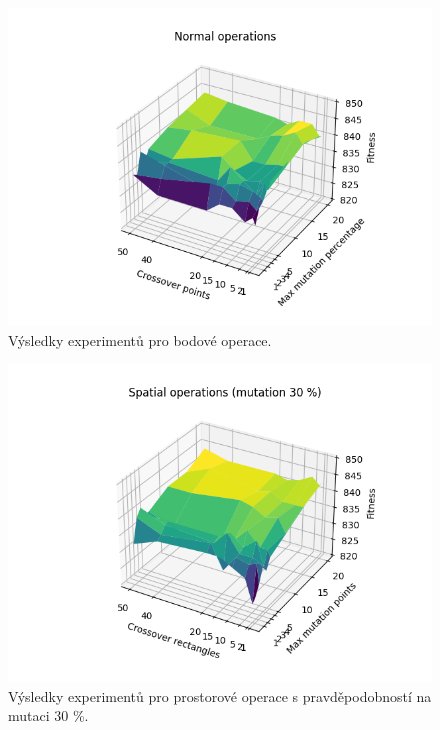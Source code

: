 \documentclass[12pt]{article}
\begin{document}
\newpage
\begin{figure}
    \centering
    \includegraphics[width=0.6\paperwidth,trim={0  0.cm 0 0.8cm},clip]{normal.png}
    \caption{Výsledky experimentů pro bodové operace.}
    \label{normal}
\end{figure}

\begin{figure}
    \centering
    \includegraphics[width=0.6\paperwidth,trim={0  0.2cm 0 0.8cm},clip]{spatial30.png}
    \caption{Výsledky experimentů pro prostorové operace s pravděpodobností na mutaci 30 \%.}
    \label{spatial30}
\end{figure}
\end{document}
